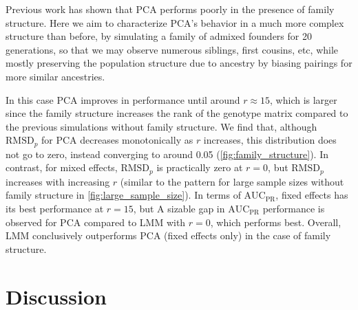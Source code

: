 \documentclass[11pt]{article}
\newcommand{\rmsd}{\text{RMSD}_p}
\newcommand{\auc}{\text{AUC}_\text{PR}}
\begin{document}
Previous work has shown that PCA performs poorly in the presence of family structure.
Here we aim to characterize PCA's behavior in a much more complex structure than before, by simulating a family of admixed founders for 20 generations, so that we may observe numerous siblings, first cousins, etc, while mostly preserving the population structure due to ancestry by biasing pairings for more similar ancestries.

In this case PCA improves in performance until around $r \approx 15$, which is larger since the family structure increases the rank of the genotype matrix compared to the previous simulations without family structure.
We find that, although $\rmsd$ for PCA decreases monotonically as $r$ increases, this distribution does not go to zero, instead converging to around 0.05 (\cref{fig:family_structure}).
In contrast, for mixed effects, $\rmsd$ is practically zero at $r=0$, but $\rmsd$ increases with increasing $r$ (similar to the pattern for large sample sizes without family structure in \cref{fig:large_sample_size}).
In terms of $\auc$, fixed effects has its best performance at $r=15$, but
A sizable gap in $\auc$ performance is observed for PCA compared to LMM with $r = 0$, which performs best.
Overall, LMM conclusively outperforms PCA (fixed effects only) in the case of family structure. 

\section{Discussion}




\end{document}
